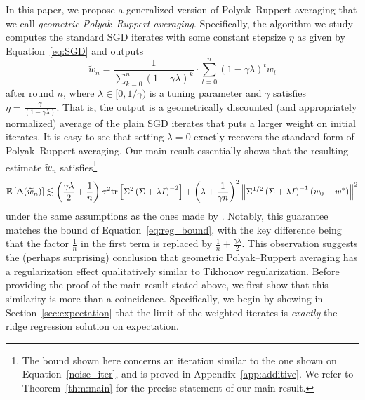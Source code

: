 \documentclass[final,12pt]{colt2018} %
\newcommand{\trace}[1]{\mbox{\normalfont tr}\left[#1\right]}
\newcommand{\EE}[1]{\mathbb{E}\left[#1\right]}
\newcommand{\norm}[1]{\left\|#1\right\|}
\newcommand{\pa}[1]{\left(#1\right)}
\newcommand{\wt}{\widetilde}
\newcommand{\tw}{\wt{w}}
\begin{document}
In this paper, we propose a generalized version of Polyak--Ruppert averaging that we call \emph{geometric Polyak--Ruppert averaging}. 
Specifically, the algorithm we study computes the standard SGD iterates with some constant stepsize $\eta$ as given by 
Equation~\eqref{eq:SGD} and outputs
\begin{equation}\label{eq:geo}
 \tw_n = \frac{1}{\sum_{k=0}^n \pa{1-\gamma \lambda}^k} \cdot \sum_{t=0}^n \pa{1-\gamma \lambda}^t w_t
\end{equation}
after round $n$, where $\lambda \in [0,1/\gamma)$ is a tuning parameter and $\gamma$ satisfies $\eta = \frac{\gamma}{(1-\gamma\lambda)}$. 
That is, the output is a geometrically discounted (and appropriately 
normalized) average of the plain SGD iterates that puts a larger weight on initial iterates. It is easy to see that setting $\lambda = 0$ 
exactly recovers the standard form of Polyak--Ruppert averaging. 
Our main result essentially shows that the resulting estimate $\tw_n$ satisfies\footnote{The bound shown here concerns an iteration similar 
to the one 
shown on Equation~\eqref{noise_iter}, and is proved in Appendix~\ref{app:additive}. We refer to Theorem~\ref{thm:main} for the precise 
statement of our main result.}
\[
 \EE{\Delta(\tw_n)} \lesssim \pa{\frac{\gamma \lambda}{2} + \frac{1}{n}}  {\sigma^2 \trace{\Sigma^2 \pa{\Sigma+\lambda I}^{-2}}} + 
\pa{\lambda + \frac{1}{\gamma n}}^2 
\norm{\Sigma^{1/2} \pa{\Sigma + \lambda I}^{-1}\pa{w_0 - w^*}}^2
\]
under the same assumptions as the ones made by \citet{DFB16}. Notably, this guarantee matches the 
bound of Equation~\eqref{eq:reg_bound}, 
with the key difference being that the factor $\frac 1n$ in the first term is replaced by  $\frac 1n + \frac{\gamma\lambda}{2}$. 
This observation suggests the (perhaps surprising) conclusion that geometric Polyak--Ruppert averaging has a regularization effect 
qualitatively similar to Tikhonov regularization. Before providing the proof of the main result stated above, we first show that this 
similarity is more than a coincidence. Specifically, we begin by showing in Section~\ref{sec:expectation} that the limit of the weighted 
iterates is \emph{exactly} the ridge regression solution on expectation.
\end{document}

